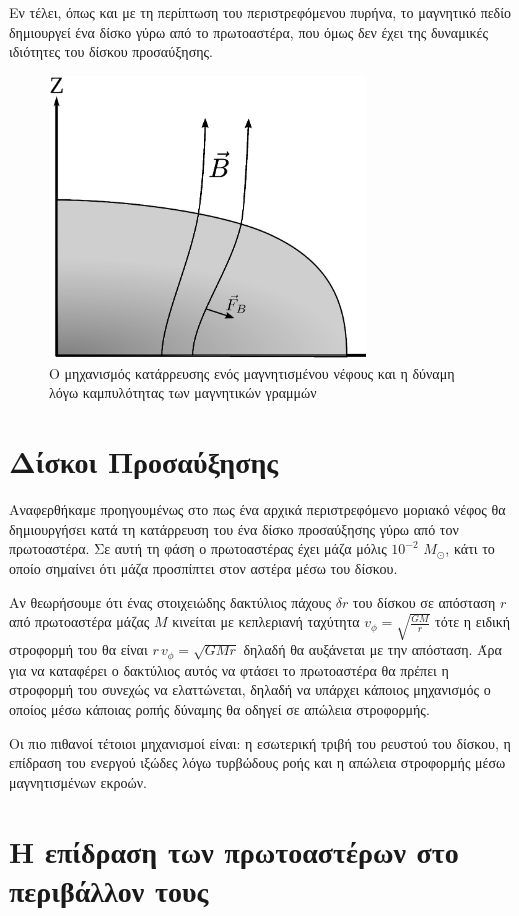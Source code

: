 \documentclass[a4paper,12pt]{memoir}
\newcommand{\sm}{$M_{\odot}$}
\begin{document}
Εν τέλει, όπως και με τη περίπτωση του περιστρεφόμενου πυρήνα, το μαγνητικό πεδίο δημιουργεί ένα δίσκο γύρω από το πρωτοαστέρα, που όμως δεν έχει της δυναμικές ιδιότητες του δίσκου προσαύξησης.


\begin{figure}[h]
	\centering
	\includegraphics[height=7.5cm]{images/magnetic_collapse.ps}
	\caption{Ο μηχανισμός κατάρρευσης ενός μαγνητισμένου νέφους και η δύναμη λόγω καμπυλότητας των μαγνητικών γραμμών}
\end{figure}


\section{Δίσκοι Προσαύξησης}
Αναφερθήκαμε προηγουμένως στο πως ένα αρχικά περιστρεφόμενο μοριακό νέφος θα δημιουργήσει κατά τη κατάρρευση του ένα δίσκο προσαύξησης γύρω από τον πρωτοαστέρα. Σε αυτή τη φάση ο πρωτοαστέρας έχει μάζα μόλις $10^{-2}$ \sm, κάτι το οποίο σημαίνει ότι μάζα προσπίπτει στον αστέρα μέσω του δίσκου.

Αν θεωρήσουμε ότι ένας στοιχειώδης δακτύλιος πάχους $\delta r$ του δίσκου σε απόσταση $r$ από πρωτοαστέρα μάζας $M$ κινείται με κεπλεριανή ταχύτητα $v_{\phi}=\sqrt{\frac{GM}{r}}$ τότε η ειδική στροφορμή του θα είναι $r \, v_{\phi}=\sqrt{GMr}$ δηλαδή θα αυξάνεται με την απόσταση. Άρα για να καταφέρει ο δακτύλιος αυτός να φτάσει το πρωτοαστέρα θα πρέπει η στροφορμή του συνεχώς να ελαττώνεται, δηλαδή να υπάρχει κάποιος μηχανισμός ο οποίος μέσω κάποιας ροπής δύναμης θα οδηγεί σε απώλεια στροφορμής.

Οι πιο πιθανοί τέτοιοι μηχανισμοί είναι: η εσωτερική τριβή του ρευστού του δίσκου, η επίδραση του ενεργού ιξώδες λόγω τυρβώδους ροής και η απώλεια στροφορμής μέσω μαγνητισμένων εκροών.


\section{Η επίδραση των πρωτοαστέρων στο περιβάλλον τους}
\end{document}
